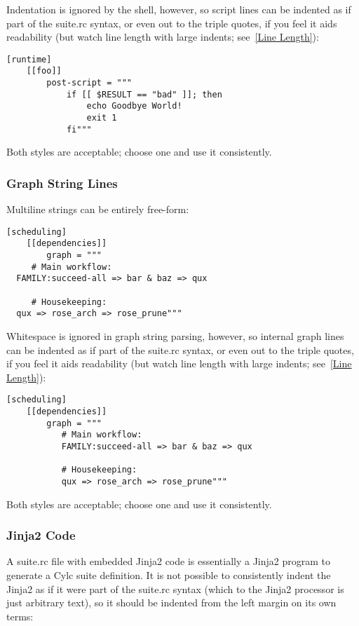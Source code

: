 Indentation is ignored by the shell, however, so script lines can be indented
as if part of the suite.rc syntax, or even out to the triple quotes, if you
feel it aids readability (but watch line length with large indents;
see~\ref{Line Length}):

\lstset{language=suiterc}
\begin{lstlisting}
[runtime]
    [[foo]]
        post-script = """
            if [[ $RESULT == "bad" ]]; then
                echo Goodbye World!
                exit 1
            fi"""
\end{lstlisting}

Both styles are acceptable; choose one and use it consistently.

\subsubsection{Graph String Lines}

Multiline \lstinline@graph@ strings can be entirely free-form:

\lstset{language=suiterc}
\begin{lstlisting}
[scheduling]
    [[dependencies]]
        graph = """
     # Main workflow:
  FAMILY:succeed-all => bar & baz => qux

     # Housekeeping: 
  qux => rose_arch => rose_prune"""
\end{lstlisting}

Whitespace is ignored in graph string parsing, however, so internal graph lines
can be indented as if part of the suite.rc syntax, or even out to the triple
quotes, if you feel it aids readability (but watch line length with large
indents; see~\ref{Line Length}):

\lstset{language=suiterc}
\begin{lstlisting}
[scheduling]
    [[dependencies]]
        graph = """
           # Main workflow:
           FAMILY:succeed-all => bar & baz => qux

           # Housekeeping: 
           qux => rose_arch => rose_prune"""
\end{lstlisting}

Both styles are acceptable; choose one and use it consistently.

\subsubsection{Jinja2 Code}

A suite.rc file with embedded Jinja2 code is essentially a Jinja2 program to
generate a Cylc suite definition. It is not possible to consistently indent the
Jinja2 as if it were part of the suite.rc syntax (which to the Jinja2 processor
is just arbitrary text), so it should be indented from the left margin on
its own terms:

